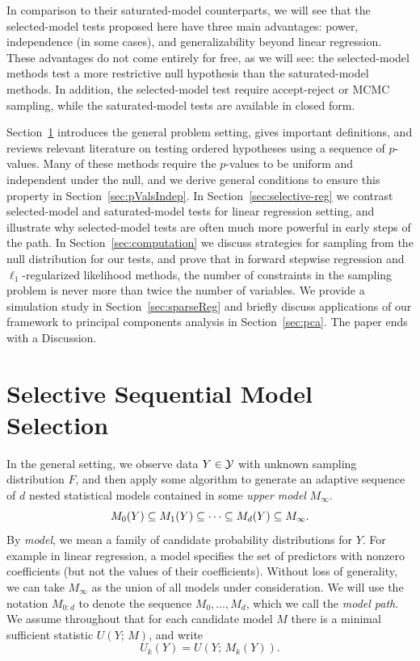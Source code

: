 \documentclass{article}
\begin{document}
In comparison to their saturated-model counterparts, we will see that the selected-model tests proposed here have three main advantages: power, independence (in some cases), and generalizability beyond linear regression. These advantages do not come entirely for free, as we will see: the selected-model methods test a more restrictive null hypothesis than the saturated-model methods. In addition, the selected-model test require accept-reject or MCMC sampling, while the saturated-model tests are available in closed form.

Section~\ref{sec:genericSetting} introduces the general problem setting, gives important definitions, and reviews relevant literature on testing ordered hypotheses using a sequence of $p$-values. Many of these methods require the $p$-values to be uniform and independent under the null, and we derive general conditions to ensure this property in Section~\ref{sec:pValsIndep}. In Section~\ref{sec:selective-reg} we contrast selected-model and saturated-model tests for linear regression setting, and illustrate why selected-model tests are often much more powerful in early steps of the path. In Section~\ref{sec:computation} we discuss strategies for sampling from the null distribution for our tests, and prove that in forward stepwise regression and $\ell_1$-regularized likelihood methods, the number of constraints in the sampling problem is never more than twice the number of variables. We provide a simulation study in Section~\ref{sec:sparseReg} and briefly discuss applications of our framework to principal components analysis in Section~\ref{sec:pca}. The paper ends with a Discussion.

\section{Selective Sequential Model Selection}
\label{sec:genericSetting}

In the general setting, we observe data $Y \in \mathcal{Y}$ with unknown sampling distribution $F$, and then apply some algorithm to generate an adaptive sequence of $d$ nested statistical models contained in some {\em upper model} $M_{\infty}$.
\[
M_0(Y) \subseteq M_1(Y) \subseteq \cdots \subseteq M_d(Y) \subseteq M_\infty.
\]
By {\em model}, we mean a family of candidate probability distributions for $Y$. For example in  linear regression, a model specifies  the set of
predictors with nonzero coefficients (but not the  values of their coefficients). Without loss of generality, we can take $M_\infty$ as the union of all models under consideration. We will use the notation $M_{0:d}$ to denote the sequence $M_0, \ldots, M_d$, which we call the {\em model path}. We assume throughout that for each candidate model $M$ there is a minimal sufficient statistic $U(Y; \,M)$, and write
\[
U_k(Y) = U(Y; \,M_k(Y)).
\]
\end{document}
